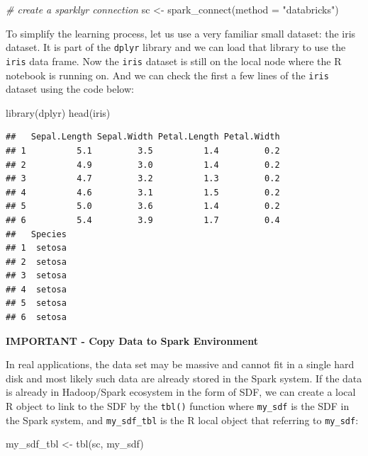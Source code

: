 \documentclass[
  12pt,
]{krantz}
\makeatletter
\newenvironment{Shaded}{\begin{snugshade}}{\end{snugshade}}
\newcommand{\AttributeTok}[1]{\textcolor[rgb]{0.61,0.61,0.61}{#1}}
\newcommand{\CommentTok}[1]{\textcolor[rgb]{0.37,0.37,0.37}{\textit{#1}}}
\newcommand{\FunctionTok}[1]{\textcolor[rgb]{0,0,0}{#1}}
\newcommand{\NormalTok}[1]{#1}
\newcommand{\OtherTok}[1]{\textcolor[rgb]{0.37,0.37,0.37}{#1}}
\newcommand{\StringTok}[1]{\textcolor[rgb]{0.5,0.5,0.5}{#1}}
\newenvironment{kframe}{%
\medskip{}
\setlength{\fboxsep}{.8em}
 \def\at@end@of@kframe{}%
 \ifinner\ifhmode%
  \def\at@end@of@kframe{\end{minipage}}%
  \begin{minipage}{\columnwidth}%
 \fi\fi%
 \def\FrameCommand##1{\hskip\@totalleftmargin \hskip-\fboxsep
 \colorbox{shadecolor}{##1}\hskip-\fboxsep
     \hskip-\linewidth \hskip-\@totalleftmargin \hskip\columnwidth}%
 \MakeFramed {\advance\hsize-\width
   \@totalleftmargin\z@ \linewidth\hsize
   \@setminipage}}%
 {\par\unskip\endMakeFramed%
 \at@end@of@kframe}
\renewenvironment{Shaded}{\begin{kframe}}{\end{kframe}}
\makeatother
\begin{document}
\begin{Shaded}
\begin{Highlighting}[]
\CommentTok{\# create a sparklyr connection}
\NormalTok{sc }\OtherTok{\textless{}{-}} \FunctionTok{spark\_connect}\NormalTok{(}\AttributeTok{method =} \StringTok{"databricks"}\NormalTok{)}
\end{Highlighting}
\end{Shaded}

To simplify the learning process, let us use a very familiar small dataset: the iris dataset. It is part of the \texttt{dplyr} library and we can load that library to use the \texttt{iris} data frame. Now the \texttt{iris} dataset is still on the local node where the R notebook is running on. And we can check the first a few lines of the \texttt{iris} dataset using the code below:

\begin{Shaded}
\begin{Highlighting}[]
\FunctionTok{library}\NormalTok{(dplyr)}
\FunctionTok{head}\NormalTok{(iris)}
\end{Highlighting}
\end{Shaded}

\begin{verbatim}
##   Sepal.Length Sepal.Width Petal.Length Petal.Width
## 1          5.1         3.5          1.4         0.2
## 2          4.9         3.0          1.4         0.2
## 3          4.7         3.2          1.3         0.2
## 4          4.6         3.1          1.5         0.2
## 5          5.0         3.6          1.4         0.2
## 6          5.4         3.9          1.7         0.4
##   Species
## 1  setosa
## 2  setosa
## 3  setosa
## 4  setosa
## 5  setosa
## 6  setosa
\end{verbatim}

\textbf{IMPORTANT - Copy Data to Spark Environment}

In real applications, the data set may be massive and cannot fit in a single hard disk and most likely such data are already stored in the Spark system. If the data is already in Hadoop/Spark ecosystem in the form of SDF, we can create a local R object to link to the SDF by the \texttt{tbl()} function where \texttt{my\_sdf} is the SDF in the Spark system, and \texttt{my\_sdf\_tbl} is the R local object that referring to \texttt{my\_sdf}:

\begin{Shaded}
\begin{Highlighting}[]
\NormalTok{my\_sdf\_tbl }\OtherTok{\textless{}{-}} \FunctionTok{tbl}\NormalTok{(sc, my\_sdf)}
\end{Highlighting}
\end{Shaded}
\end{document}
